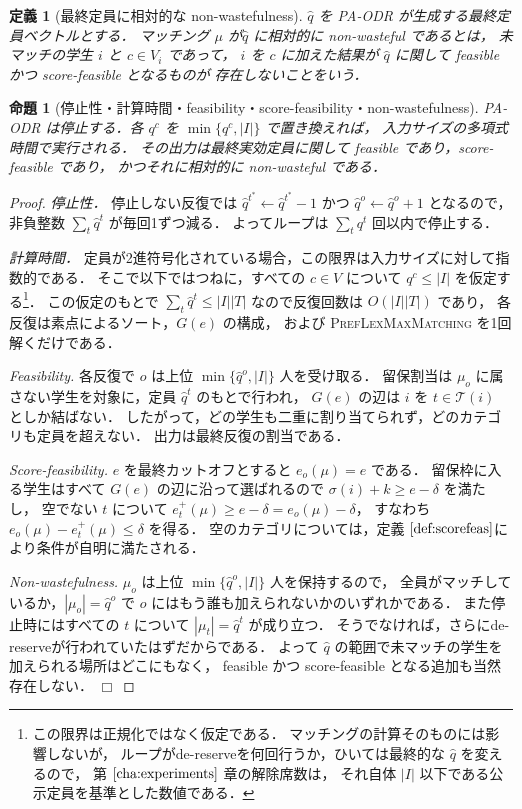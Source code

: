 \documentclass[
    12pt,          %
    a4paper,       %
    oneside,       %
    onecolumn,     %
    titlepage,     %
    final          %
]{jreport} %
\newcommand{\refchapter}[1]{第 $\ref{#1}$ 章}
\newcommand{\refdefinition}[1]{定義 $\ref{#1}$}
\newtheorem{definition}{定義}[chapter]
\newtheorem{proof}{証明}[chapter]
\newtheorem{proposition}{命題}[chapter]
\newcommand{\qed}{\hfill $\Box$ \par}
\renewcommand{\T}{\mathcal{T}}   %
\begin{document}
\begin{definition}[最終定員に相対的な non-wastefulness]
\label{def:nw-hat}
$\hat q$ を PA-ODR が生成する最終定員ベクトルとする．
マッチング $\mu$ が\emph{$\hat q$ に相対的に non-wasteful である}とは，
未マッチの学生 $i$ と $c\in V_i$ であって，
$i$ を $c$ に加えた結果が $\hat q$ に関して feasible かつ score-feasible となるものが
存在しないことをいう．
\end{definition}

\begin{proposition}[停止性・計算時間・feasibility・score-feasibility・non-wastefulness]
\label{prop:paodr-basic}
PA-ODR は停止する．各 $q^c$ を $\min\{q^c,|I|\}$ で置き換えれば，
入力サイズの多項式時間で実行される．
その出力は最終実効定員に関して feasible であり，score-feasible であり，
かつそれに相対的に non-wasteful である．
\end{proposition}

\begin{proof}
\emph{停止性．}
停止しない反復では $\hat q^{t^\ast}\gets\hat q^{t^\ast}-1$ かつ
$\hat q^o\gets\hat q^o+1$ となるので，非負整数 $\sum_{t}\hat q^t$ が毎回1ずつ減る．
よってループは $\sum_t q^t$ 回以内で停止する．

\emph{計算時間．}
定員が2進符号化されている場合，この限界は入力サイズに対して指数的である．
そこで以下ではつねに，すべての $c\in V$ について $q^c\le|I|$ を仮定する\footnote{%
この限界は正規化ではなく仮定である．
マッチングの計算そのものには影響しないが，
ループがde-reserveを何回行うか，ひいては最終的な $\hat q$ を変えるので，
\refchapter{cha:experiments}の解除席数は，
それ自体 $|I|$ 以下である公示定員を基準とした数値である．}．
この仮定のもとで $\sum_t\hat q^t\le|I||T|$ なので反復回数は $O(|I||T|)$ であり，
各反復は素点によるソート，$G(e)$ の構成，
および \textsc{PrefLexMaxMatching} を1回解くだけである．

\emph{Feasibility.}
各反復で $o$ は上位 $\min\{\hat q^o,|I|\}$ 人を受け取る．
留保割当は $\mu_o$ に属さない学生を対象に，定員 $\hat q^t$ のもとで行われ，
$G(e)$ の辺は $i$ を $t\in\T(i)$ としか結ばない．
したがって，どの学生も二重に割り当てられず，どのカテゴリも定員を超えない．
出力は最終反復の割当である．

\emph{Score-feasibility.}
$e$ を最終カットオフとすると $e_o(\mu)=e$ である．
留保枠に入る学生はすべて $G(e)$ の辺に沿って選ばれるので $\sigma(i)+k\ge e-\delta$ を満たし，
空でない $t$ について $e_t^+(\mu)\ge e-\delta=e_o(\mu)-\delta$，
すなわち $e_o(\mu)-e_t^+(\mu)\le\delta$ を得る．
空のカテゴリについては，\refdefinition{def:scorefeas}により条件が自明に満たされる．

\emph{Non-wastefulness.}
$\mu_o$ は上位 $\min\{\hat q^o,|I|\}$ 人を保持するので，
全員がマッチしているか，$|\mu_o|=\hat q^o$ で $o$ にはもう誰も加えられないかのいずれかである．
また停止時にはすべての $t$ について $|\mu_t|=\hat q^t$ が成り立つ．
そうでなければ，さらにde-reserveが行われていたはずだからである．
よって $\hat q$ の範囲で未マッチの学生を加えられる場所はどこにもなく，
feasible かつ score-feasible となる追加も当然存在しない．
\qed
\end{proof}
\end{document}
